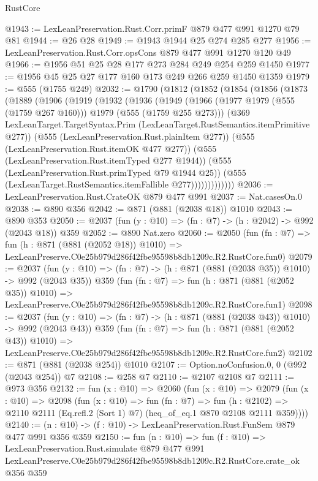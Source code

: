 \begin{lexlean}{RustCore}
\begin{coremodule}
@1943 := LexLeanPreservation.Rust.Corr.primF @879 @477 @991 @1270 @79 @81
@1944 := @26 @28
@1949 := @1943 @1944 @25 @274 @285 @277
@1956 := LexLeanPreservation.Rust.Corr.opsCons @879 @477 @991 @1270 @120 @49
@1966 := @1956 @51 @25 @28 @177 @273 @284 @249 @254 @259 @1450
@1977 := @1956 @45 @25 @27 @177 @160 @173 @249 @266 @259 @1450 @1359
@1979 := @555 (@1755 @249)
@2032 := @1790
    (@1812
      (@1852
        (@1854
          (@1856
            (@1873
              (@1889
                (@1906
                  (@1919
                    (@1932
                      (@1936
                        (@1949
                          (@1966
                            (@1977 @1979 (@555 (@1759 @267 @160)))
                            @1979
                            (@555 (@1759 @255 @273)))
                          (@369
                            LexLeanTarget.TargetSyntax.Prim
                            (LexLeanTarget.RustSemantics.itemPrimitive @277))
                          (@555 (LexLeanPreservation.Rust.plainItem @277))
                          (@555 (LexLeanPreservation.Rust.itemOK @477 @277))
                          (@555 (LexLeanPreservation.Rust.itemTyped @277 @1944))
                          (@555 (LexLeanPreservation.Rust.primTyped @79 @1944 @25))
                          (@555 (LexLeanTarget.RustSemantics.itemFallible @277)))))))))))))
@2036 := LexLeanPreservation.Rust.CrateOK @879 @477 @991
@2037 := Nat.casesOn.{0}
@2038 := @890 @356
@2042 := @871 (@881 (@2038 @18)) @1010
@2043 := @890 @353
@2050 := @2037 (fun (y : @10) => (fn : @7) -> (h : @2042) -> @992 (@2043 @18)) @359
@2052 := @890 Nat.zero
@2060 := @2050
    (fun (fn : @7) =>
    fun (h : @871 (@881 (@2052 @18)) @1010) =>
    LexLeanPreserve.C0e25b979d286f42fbe95598b8db1209c.R2.RustCore.fun0)
@2079 := @2037
    (fun (y : @10) => (fn : @7) -> (h : @871 (@881 (@2038 @35)) @1010) -> @992 (@2043 @35))
    @359
    (fun (fn : @7) =>
    fun (h : @871 (@881 (@2052 @35)) @1010) =>
    LexLeanPreserve.C0e25b979d286f42fbe95598b8db1209c.R2.RustCore.fun1)
@2098 := @2037
    (fun (y : @10) => (fn : @7) -> (h : @871 (@881 (@2038 @43)) @1010) -> @992 (@2043 @43))
    @359
    (fun (fn : @7) =>
    fun (h : @871 (@881 (@2052 @43)) @1010) =>
    LexLeanPreserve.C0e25b979d286f42fbe95598b8db1209c.R2.RustCore.fun2)
@2102 := @871 (@881 (@2038 @254)) @1010
@2107 := Option.noConfusion.{0, 0} (@992 (@2043 @254)) @7
@2108 := @258 @7
@2110 := @2107 @2108 @7
@2111 := @973 @356
@2132 := fun (x : @10) =>
  @2060
    (fun (x : @10) =>
    @2079
      (fun (x : @10) =>
      @2098
        (fun (x : @10) =>
        fun (fn : @7) =>
        fun (h : @2102) =>
        @2110 @2111 (Eq.refl.{2} (Sort 1) @7) (heq_of_eq.{1} @870 @2108 @2111 @359))))
@2140 := (n : @10) -> (f : @10) -> LexLeanPreservation.Rust.FunSem @879 @477 @991 @356 @359
@2150 := fun (n : @10) =>
  fun (f : @10) =>
  LexLeanPreservation.Rust.simulate
    @879
    @477
    @991
    LexLeanPreserve.C0e25b979d286f42fbe95598b8db1209c.R2.RustCore.crate_ok
    @356
    @359
\end{coremodule}
\end{lexlean}
